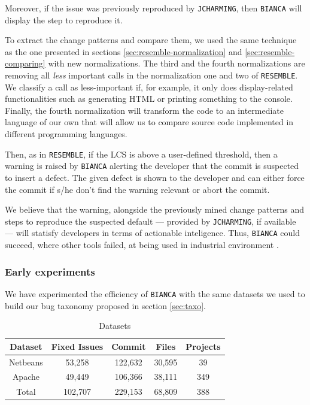 Moreover, if the issue was previously reproduced by {\tt JCHARMING}, then {\tt BIANCA} will display the step to reproduce it.


To extract the change patterns and compare them, we used the same technique as the one presented in sections \ref{sec:resemble-normalization} and \ref{sec:resemble-comparing} with new normalizations.
The third and the fourth normalizations are removing all {\it less} important calls in the normalization one and two of {\tt RESEMBLE}.
We classify a call as less-important if, for example, it only does display-related functionalities such as generating HTML or printing something to the console. Finally, the fourth normalization will transform the code to an intermediate language of our own that will allow us to compare source code implemented in different programming languages.

Then, as in {\tt RESEMBLE}, if the LCS is above a user-defined threshold, then a warning is raised by {\tt BIANCA} alerting the developer that the commit is suspected to insert a defect.
The given defect is shown to the developer and can either force the commit if s/he don't find the warning relevant or abort the commit.

We believe that the warning, alongside the previously mined change patterns and steps to reproduce the suspected default --- provided by {\tt JCHARMING}, if available --- will statisfy developers in terms of actionable inteligence.
Thus, {\tt BIANCA} could succeed, where other tools failed, at being used in industrial environment	\cite{Lewis2013}.


\subsubsection{Early experiments}

We have experimented the efficiency of {\tt BIANCA} with the same datasets we used to build our bug taxonomy proposed in section \ref{sec:taxo}.

\begin{table}[h]
\begin{center}
\begin{tabular}{@{}c|c|c|c|c@{}}
\textbf{Dataset} & \textbf{Fixed Issues} & \textbf{Commit} & \textbf{Files} & \textbf{Projects} \\ \hline \hline
Netbeans         & 53,258          & 122,632     & 30,595         & 39                \\
Apache           & 49,449          & 106,366     & 38,111         & 349               \\
Total            & 102,707         & 229,153     & 68,809         & 388               \\ \hline \hline

\end{tabular}
\end{center}

\caption{Datasets\label{table:datasets-bianca}}
\end{table}

